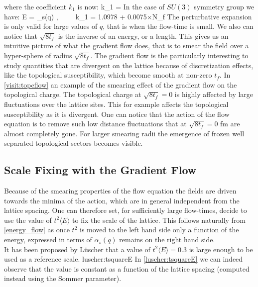 \eeq
where the coefficient $k_1$ is now:
\beq
   k_1 =   
\eeq
In the case of $SU(3)$ symmetry group we have:
\beq
    \langle E \rangle =  \alpha_s(q) ,~~~~~k_1 = 1.0978 + 0.0075×N_f
    \label{energy_flow}
\eeq
The perturbative expansion is only valid for large values of $q$, that is when the flow-time is small. We also can notice that $\sqrt{8t_f}$ is the inverse of an energy, or a length. This gives us an intuitive picture of what the gradient flow does, that is to smear the field over a hyper-sphere of radius $\sqrt{8t_f}$. The gradient flow is the particularly interesting to study quantities that are divergent on the lattice because of discretization effects, like the topological susceptibility, which become smooth at non-zero $t_f$. In \cref{visit:topcflow} an example of the smearing effect of the gradient flow on the topological charge. 
The topological charge at $\sqrt{8t_f} = 0$ is highly affected by large fluctuations over the lattice sites. This for example affects the topological susceptibility as it is divergent. One can notice that the action of the flow equation is to remove such low distance fluctuations that at $\sqrt{8t_f} = 0$ fm are almost completely gone. For larger smearing radii the emergence of frozen well separated topological sectors becomes visible.

\subsection{Scale Fixing with the Gradient Flow}
\label{sec:scale_fixing}
Because of the smearing properties of the flow equation the fields are driven towards the minima of the action, which are in general independent from the lattice spacing. One can therefore set, for sufficiently large flow-times, decide to use the value of $t^2\langle E\rangle$ to fix the scale of the lattice. This follows naturally from \cref{energy_flow} as once $t^2$ is moved to the left hand side only a function of the energy, expressed in terms of $\alpha_s(q)$ remains on the right hand side. \\
It has been proposed by L{\"u}scher that a value of $t^2\langle E\rangle = 0.3$ is large enough to be used as a reference scale. 
 {luscher:tsquareE}
In \cref{luscher:tsquareE} we can indeed observe that the value is constant as a function of the lattice spacing (computed instead using the Sommer parameter).

